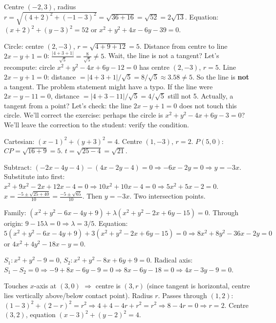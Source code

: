 \documentclass[11pt]{article}
\begin{document}
\begin{corrige}[Exercise 1]
Centre $(-2,3)$, radius $r=\sqrt{(4+2)^2+(-1-3)^2}=\sqrt{36+16}=\sqrt{52}=2\sqrt{13}$.
Equation: $(x+2)^2+(y-3)^2=52$ or $x^2+y^2+4x-6y-39=0$.
\end{corrige}

\begin{corrige}[Exercise 2]
Circle: centre $(2,-3)$, $r=\sqrt{4+9+12}=5$. Distance from centre to line $2x-y+1=0$:
$\frac{|4+3+1|}{\sqrt{5}}=\frac{8}{\sqrt{5}}\neq5$. Wait, the line is not a tangent? Let's recompute: circle $x^2+y^2-4x+6y-12=0$ has centre $(2,-3)$, $r=5$. Line $2x-y+1=0$: distance $=|4+3+1|/\sqrt{5}=8/\sqrt{5}\approx3.58\neq5$. So the line is \textbf{not} a tangent. The problem statement might have a typo. If the line were $2x-y-11=0$, distance $=|4+3-11|/\sqrt{5}=4/\sqrt{5}$ still not 5. Actually, a tangent from a point? Let's check: the line $2x-y+1=0$ does not touch this circle. We'll correct the exercise: perhaps the circle is $x^2+y^2-4x+6y-3=0$? We'll leave the correction to the student: verify the condition.
\end{corrige}

\begin{corrige}[Exercise 3]
Cartesian: $(x-1)^2+(y+3)^2=4$. Centre $(1,-3)$, $r=2$. $P(5,0)$: $CP=\sqrt{16+9}=5$. $t=\sqrt{25-4}=\sqrt{21}$.
\end{corrige}

\begin{corrige}[Exercise 4]
Subtract: $(-2x-4y-4)-(4x-2y-4)=0 \Rightarrow -6x-2y=0 \Rightarrow y=-3x$.
Substitute into first: $x^2+9x^2-2x+12x-4=0 \Rightarrow 10x^2+10x-4=0 \Rightarrow 5x^2+5x-2=0$.
$x=\frac{-5\pm\sqrt{25+40}}{10}=\frac{-5\pm\sqrt{65}}{10}$. Then $y=-3x$. Two intersection points.
\end{corrige}

\begin{corrige}[Exercise 5]
Family: $(x^2+y^2-6x-4y+9)+\lambda(x^2+y^2-2x+6y-15)=0$.
Through origin: $9-15\lambda=0 \Rightarrow \lambda=3/5$.
Equation: $5(x^2+y^2-6x-4y+9)+3(x^2+y^2-2x+6y-15)=0 \Rightarrow 8x^2+8y^2-36x-2y=0$ or $4x^2+4y^2-18x-y=0$.
\end{corrige}

\begin{corrige}[Exercise 6]
$S_1: x^2+y^2-9=0$, $S_2: x^2+y^2-8x+6y+9=0$.
Radical axis: $S_1-S_2=0 \Rightarrow -9+8x-6y-9=0 \Rightarrow 8x-6y-18=0 \Rightarrow 4x-3y-9=0$.
\end{corrige}

\begin{corrige}[Exercise 7]
Touches $x$-axis at $(3,0)$ $\Rightarrow$ centre is $(3,r)$ (since tangent is horizontal, centre lies vertically above/below contact point). Radius $r$. Passes through $(1,2)$: $(1-3)^2+(2-r)^2=r^2 \Rightarrow 4+4-4r+r^2=r^2 \Rightarrow 8-4r=0 \Rightarrow r=2$.
Centre $(3,2)$, equation $(x-3)^2+(y-2)^2=4$.
\end{corrige}
\end{document}
